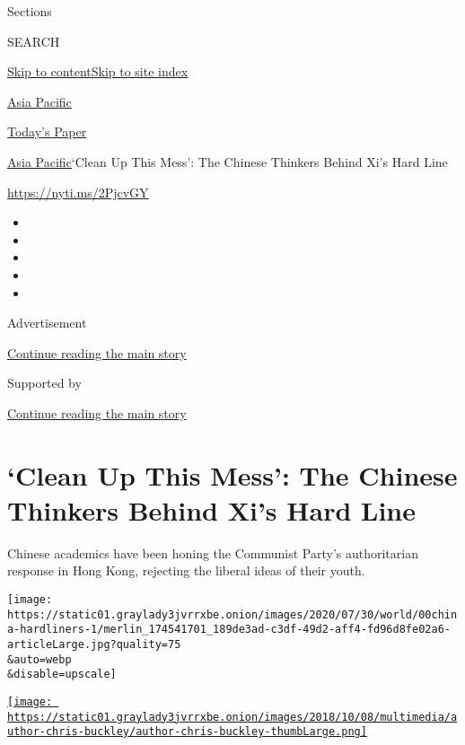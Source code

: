Sections

SEARCH

\protect\hyperlink{site-content}{Skip to
content}\protect\hyperlink{site-index}{Skip to site index}

\href{https://www.nytimes3xbfgragh.onion/section/world/asia}{Asia
Pacific}

\href{https://myaccount.nytimes3xbfgragh.onion/auth/login?response_type=cookie\&client_id=vi}{}

\href{https://www.nytimes3xbfgragh.onion/section/todayspaper}{Today's
Paper}

\href{/section/world/asia}{Asia Pacific}\textbar{}`Clean Up This Mess':
The Chinese Thinkers Behind Xi's Hard Line

\url{https://nyti.ms/2PjcvGY}

\begin{itemize}
\item
\item
\item
\item
\item
\end{itemize}

Advertisement

\protect\hyperlink{after-top}{Continue reading the main story}

Supported by

\protect\hyperlink{after-sponsor}{Continue reading the main story}

\hypertarget{clean-up-this-mess-the-chinese-thinkers-behind-xis-hard-line}{%
\section{`Clean Up This Mess': The Chinese Thinkers Behind Xi's Hard
Line}\label{clean-up-this-mess-the-chinese-thinkers-behind-xis-hard-line}}

Chinese academics have been honing the Communist Party's authoritarian
response in Hong Kong, rejecting the liberal ideas of their youth.

\texttt{[image: https://static01.graylady3jvrrxbe.onion/images/2020/07/30/world/00china-hardliners-1/merlin\_174541701\_189de3ad-c3df-49d2-aff4-fd96d8fe02a6-articleLarge.jpg?quality=75\\\&auto=webp\\\&disable=upscale]}

\href{https://www.nytimes3xbfgragh.onion/by/chris-buckley}{\texttt{[image: https://static01.graylady3jvrrxbe.onion/images/2018/10/08/multimedia/author-chris-buckley/author-chris-buckley-thumbLarge.png]}}

